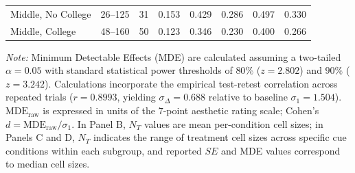 \begin{table}[ht!]
\begin{tabular*}{\linewidth}{@{\extracolsep{\fill}}lccccccc@{}}
Middle, No College & 26--125 & 31 & 0.153 & 0.429 & 0.286 & 0.497 & 0.330 \\
Middle, College & 48--160 & 50 & 0.123 & 0.346 & 0.230 & 0.400 & 0.266 \\
\bottomrule
\end{tabular*}
\begin{minipage}{\linewidth}
\vspace{4pt}
\footnotesize
\textit{Note:} Minimum Detectable Effects (MDE) are calculated assuming a two-tailed $\alpha = 0.05$ with standard statistical power thresholds of $80\%$ ($z = 2.802$) and $90\%$ ($z = 3.242$). Calculations incorporate the empirical test-retest correlation across repeated trials ($r = 0.8993$, yielding $\sigma_{\Delta} = 0.688$ relative to baseline $\sigma_1 = 1.504$). $\text{MDE}_{\text{raw}}$ is expressed in units of the 7-point aesthetic rating scale; Cohen's $d = \text{MDE}_{\text{raw}} / \sigma_1$. In Panel B, $N_T$ values are mean per-condition cell sizes; in Panels C and D, $N_T$ indicates the range of treatment cell sizes across specific cue conditions within each subgroup, and reported $SE$ and MDE values correspond to median cell sizes.
\end{minipage}
\end{table}
